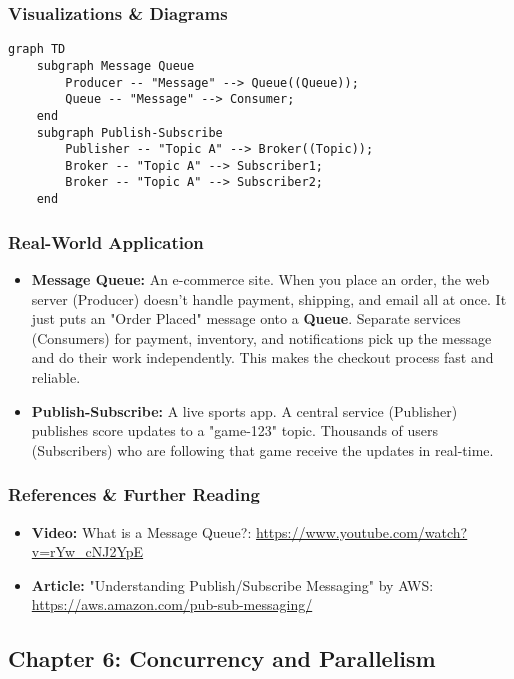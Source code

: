 \documentclass{article}
\begin{document}
\subsubsection{Visualizations \& Diagrams}
\begin{verbatim}
graph TD
    subgraph Message Queue
        Producer -- "Message" --> Queue((Queue));
        Queue -- "Message" --> Consumer;
    end
    subgraph Publish-Subscribe
        Publisher -- "Topic A" --> Broker((Topic));
        Broker -- "Topic A" --> Subscriber1;
        Broker -- "Topic A" --> Subscriber2;
    end
\end{verbatim}

\subsubsection{Real-World Application}
\begin{itemize}
    \item \textbf{Message Queue:} An e-commerce site. When you place an order, the web server (Producer) doesn't handle payment, shipping, and email all at once. It just puts an "Order Placed" message onto a \textbf{Queue}. Separate services (Consumers) for payment, inventory, and notifications pick up the message and do their work independently. This makes the checkout process fast and reliable.
    \item \textbf{Publish-Subscribe:} A live sports app. A central service (Publisher) publishes score updates to a "game-123" topic. Thousands of users (Subscribers) who are following that game receive the updates in real-time.
\end{itemize}

\subsubsection{References \& Further Reading}
\begin{itemize}
    \item \textbf{Video:} What is a Message Queue?: \url{https://www.youtube.com/watch?v=rYw_cNJ2YpE}
    \item \textbf{Article:} "Understanding Publish/Subscribe Messaging" by AWS: \url{https://aws.amazon.com/pub-sub-messaging/}
\end{itemize}

\subsection{Chapter 6: Concurrency and Parallelism}
\end{document}
